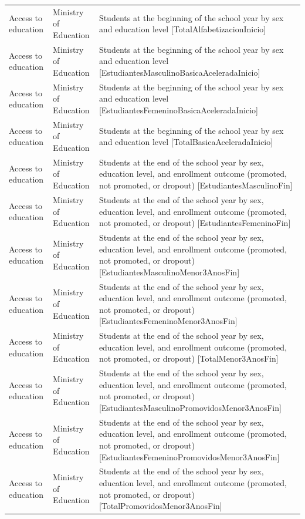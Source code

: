 \documentclass[10pt,a4paper]{article}
\begin{document}
\begin{longtable}{@{}>{\raggedright\arraybackslash}p{3.5cm}>{\raggedright\arraybackslash}p{5.6cm}>{\raggedright\arraybackslash}p{\dimexpr\textwidth-9.1cm-4\tabcolsep\relax}@{}}
Access to education & Ministry of Education & Students at the beginning of the school year by sex and education level [TotalAlfabetizacionInicio]\\
Access to education & Ministry of Education & Students at the beginning of the school year by sex and education level [EstudiantesMasculinoBasicaAceleradaInicio]\\
Access to education & Ministry of Education & Students at the beginning of the school year by sex and education level [EstudiantesFemeninoBasicaAceleradaInicio]\\
Access to education & Ministry of Education & Students at the beginning of the school year by sex and education level [TotalBasicaAceleradaInicio]\\
Access to education & Ministry of Education & Students at the end of the school year by sex, education level, and enrollment outcome (promoted, not promoted, or dropout) [EstudiantesMasculinoFin]\\
Access to education & Ministry of Education & Students at the end of the school year by sex, education level, and enrollment outcome (promoted, not promoted, or dropout) [EstudiantesFemeninoFin]\\
Access to education & Ministry of Education & Students at the end of the school year by sex, education level, and enrollment outcome (promoted, not promoted, or dropout) [EstudiantesMasculinoMenor3AnosFin]\\
Access to education & Ministry of Education & Students at the end of the school year by sex, education level, and enrollment outcome (promoted, not promoted, or dropout) [EstudiantesFemeninoMenor3AnosFin]\\
Access to education & Ministry of Education & Students at the end of the school year by sex, education level, and enrollment outcome (promoted, not promoted, or dropout) [TotalMenor3AnosFin]\\
Access to education & Ministry of Education & Students at the end of the school year by sex, education level, and enrollment outcome (promoted, not promoted, or dropout) [EstudiantesMasculinoPromovidosMenor3AnosFin]\\
Access to education & Ministry of Education & Students at the end of the school year by sex, education level, and enrollment outcome (promoted, not promoted, or dropout) [EstudiantesFemeninoPromovidosMenor3AnosFin]\\
Access to education & Ministry of Education & Students at the end of the school year by sex, education level, and enrollment outcome (promoted, not promoted, or dropout) [TotalPromovidosMenor3AnosFin]\\

\end{longtable}
\end{document}

